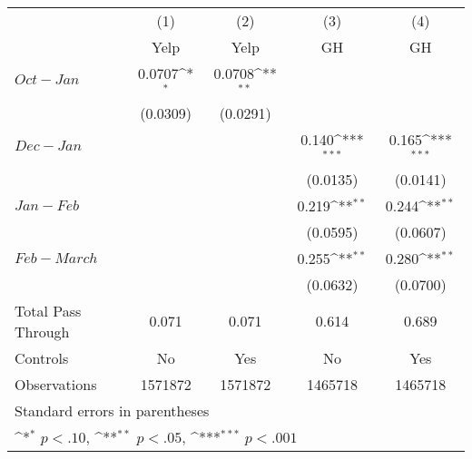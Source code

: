 {
\def\sym#1{\ifmmode^{#1}\else\(^{#1}\)\fi}
\begin{tabular}{l*{4}{c}}
\hline\hline
                    &\multicolumn{1}{c}{(1)}&\multicolumn{1}{c}{(2)}&\multicolumn{1}{c}{(3)}&\multicolumn{1}{c}{(4)}\\
                    &\multicolumn{1}{c}{Yelp}&\multicolumn{1}{c}{Yelp}&\multicolumn{1}{c}{GH}&\multicolumn{1}{c}{GH}\\
\hline
$ Oct - Jan  $&      0.0707\sym{*}  &      0.0708\sym{**} &       &      \\
                    &    (0.0309)         &    (0.0291)         &           &    \\
[1em]
$ Dec - Jan $&      &       &       0.140\sym{***}&       0.165\sym{***}\\
                    &          &         &    (0.0135)         &    (0.0141)         \\
[1em]
$ Jan - Feb $&                     &                     &       0.219\sym{**} &       0.244\sym{**} \\
                    &                     &                     &    (0.0595)         &    (0.0607)         \\
 [1em]
$Feb - March$&                     &                     &       0.255\sym{**} &       0.280\sym{**} \\
                    &                     &                     &    (0.0632)         &    (0.0700)         \\
\hline
Total Pass Through & 0.071 & 0.071 & 0.614 & 0.689 \\
Controls & No & Yes & No & Yes \\
Observations        &     1571872         &     1571872         &     1465718         &     1465718         \\
\hline\hline
\multicolumn{5}{l}{\footnotesize Standard errors in parentheses}\\
\multicolumn{5}{l}{\footnotesize \sym{*} \(p<.10\), \sym{**} \(p<.05\), \sym{***} \(p<.001\)}\\
\end{tabular}
}
